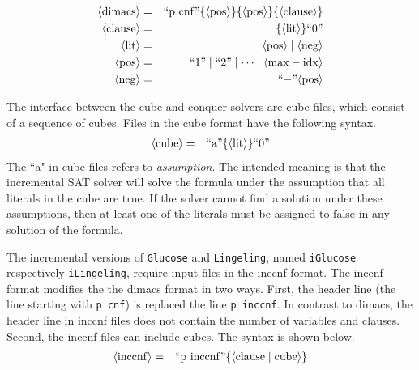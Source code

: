 \documentclass{llncs}
\begin{document}
\begin{eqnarray*}   
   \langle \mathrm{dimacs} \rangle           &=& ``\mathrm{p~cnf}" \{\langle \mathrm{pos} \rangle\}  \{\langle \mathrm{pos} \rangle\} \{ \langle \mathrm{clause} \rangle \}\\
   \langle \mathrm{clause} \rangle         &=&  \{  \langle \mathrm{lit} \rangle \} ``0"\\
   \langle \mathrm{lit} \rangle                 &=&  \langle \mathrm{pos} \rangle \mid  \langle \mathrm{neg} \rangle\\
   \langle \mathrm{pos} \rangle              &=&  ``1" \mid  ``2" \mid \dots \mid  \langle \mathrm{max-idx} \rangle\\
   \langle \mathrm{neg} \rangle              &=& ``\mathrm{-}" \langle \mathrm{pos} \rangle\\
\end{eqnarray*}


\noindent
The interface between the cube and conquer solvers are {\sc cube} files, which consist of a
sequence of cubes. Files in the {\sc cube} format have the following syntax.
\begin{eqnarray*}   
   \langle \mathrm{cube} \rangle         &=& ``\mathrm{a}" \{  \langle \mathrm{lit} \rangle \} ``0"\\
\end{eqnarray*}
The ``a" in {\sc cube} files refers to {\em assumption}. The intended meaning is that the 
incremental SAT solver will solve the formula under the assumption that all literals in the
cube are true. If the solver cannot find a solution under these assumptions, then at least
one of the literals must be assigned to false in any solution of the formula. 

The incremental versions of {\tt Glucose} and {\tt Lingeling},  named
 {\tt iGlucose} respectively {\tt iLingeling}, require input files in the {\sc inccnf}
format. The {\sc inccnf} format modifies the the {\sc dimacs} format in two 
ways. First, the header line (the line starting with {\tt p cnf}) is replaced the
line {\tt p inccnf}. In contrast to {\sc dimacs}, the header line in {\sc inccnf} files
does not contain the number of variables and clauses. Second, the {\sc inccnf} files
can include cubes. The syntax is shown below.
\begin{eqnarray*}   
   \langle \mathrm{inccnf} \rangle         &=& ``\mathrm{p~inccnf}" \{  \langle \mathrm{clause} \mid  \mathrm{cube} \rangle \}\\
\end{eqnarray*}
\end{document}
